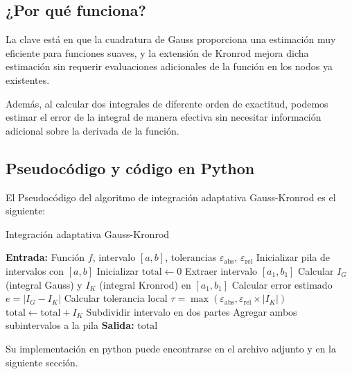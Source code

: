 \documentclass{article}
\begin{document}
\subsection{¿Por qué funciona?}
La clave está en que la cuadratura de Gauss proporciona una estimación muy eficiente para funciones suaves, y la extensión de Kronrod mejora dicha estimación sin requerir evaluaciones adicionales de la función en los nodos ya existentes.

Además, al calcular dos integrales de diferente orden de exactitud, podemos estimar el error de la integral de manera efectiva sin necesitar información adicional sobre la derivada de la función.

\subsection{Pseudocódigo y código en Python}
El Pseudocódigo del algoritmo de integración adaptativa Gauss-Kronrod es el siguiente:
\begin{algorithm}[H]
\caption{Integración adaptativa Gauss-Kronrod}
\begin{algorithmic}[1]
\STATE \textbf{Entrada:} Función $f$, intervalo $[a,b]$, tolerancias $\varepsilon_{\text{abs}}$, $\varepsilon_{\text{rel}}$
\STATE Inicializar pila de intervalos con $[a,b]$
\STATE Inicializar $\text{total} \leftarrow 0$
    \STATE Extraer intervalo $[a_1,b_1]$
    \STATE Calcular $I_G$ (integral Gauss) y $I_K$ (integral Kronrod) en $[a_1,b_1]$
    \STATE Calcular error estimado $e = |I_G - I_K|$
    \STATE Calcular tolerancia local $\tau = \max(\varepsilon_{\text{abs}}, \varepsilon_{\text{rel}} \times |I_K|)$
        \STATE $\text{total} \leftarrow \text{total} + I_K$
    \ELSE
        \STATE Subdividir intervalo en dos partes
        \STATE Agregar ambos subintervalos a la pila
    \ENDIF
\ENDWHILE
\STATE \textbf{Salida:} $\text{total}$
\end{algorithmic}
\end{algorithm}

Su implementación en python puede encontrarse en el archivo adjunto y en la siguiente sección. 
\end{document}
